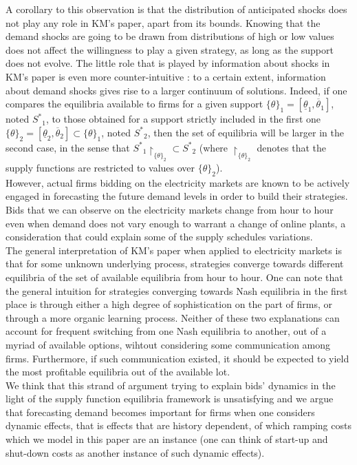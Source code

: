 A corollary to this observation is that the distribution of anticipated shocks does not play any role in KM's paper, apart from its bounds. Knowing that the demand shocks are going to be drawn from distributions of high or low values does not affect the willingness to play a given strategy, as long as the support does not evolve. The little role that is played by information about shocks in KM's paper is even more counter-intuitive : to a certain extent, information about demand shocks gives rise to a larger continuum of solutions. Indeed, if one compares the equilibria available to firms for a given support $\{\theta\}_1=[\underline{\theta}_1, \overline{\theta}_1]$, noted ${S^*}_1$, to those obtained for a support strictly included in the first one $\{\theta\}_2=[\underline{\theta}_2, \overline{\theta}_2]\subset\{\theta\}_1$, noted ${S^*}_2$, then the set of equilibria will be larger in the second case, in the sense that $ {S^*}_1\restriction_{\{\theta\}_2}\subset {S^*}_2$ (where $\restriction_{\{\theta\}_2}$ denotes that the supply functions are restricted to values over $\{\theta\}_2$). \\

However, actual firms bidding on the electricity markets are known to be actively engaged in forecasting the future demand levels in order to build their strategies. Bids that we can observe on the electricity markets change from hour to hour even when demand does not vary enough to warrant a change of online plants, a consideration that could explain some of the supply schedules variations. \\

The general interpretation of KM's paper when applied to electricity markets is that for some unknown underlying process, strategies converge towards different equilibria of the set of available equilibria from hour to hour. One can note that the general intuition for strategies converging towards Nash equilibria in the first place is through either a high degree of sophistication on the part of firms, or through a more organic learning process. Neither of these two explanations can account for frequent switching from one Nash equilibria to another, out of a myriad of available options, wihtout considering some communication among firms. Furthermore, if such communication existed, it should be expected to yield the most profitable equilibria out of the available lot.\\ 

We think that this strand of argument trying to explain bids' dynamics in the light of the supply function equilibria framework is unsatisfying and we argue that forecasting demand becomes important for firms when one considers dynamic effects, that is effects that are history dependent, of which ramping costs which we model in this paper are an instance (one can think of start-up and shut-down costs as another instance of such dynamic effects). \\

